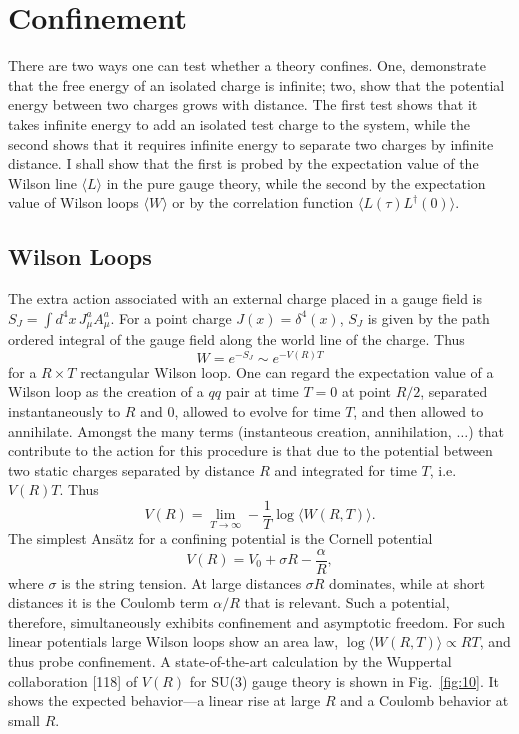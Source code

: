 \section{Confinement}
\label{sec:confinement}

There are two ways one can test whether a theory confines. One, demonstrate
that the free energy of an isolated charge is infinite; two, show that the
potential energy between two charges grows with distance. The first test
shows that it takes infinite energy to add an isolated test charge to the
system, while the second shows that it requires infinite energy to separate
two charges by infinite distance. I shall show that the first is probed by
the expectation value of the Wilson line $\langle L\rangle$ in the pure
gauge theory, while the second by the expectation value of Wilson loops
$\langle W\rangle$ or by the correlation function
$\langle L(\tau) L^\dagger(0)\rangle$.

\subsection{Wilson Loops}
\label{sec:wilson-loops}

The extra action associated with an external charge placed in a gauge field
is $S_J = \int d^4x\, J_\mu^a A_\mu^a$. For a point charge $J(x) =
\delta^4(x)$, $S_J$ is given by the path ordered integral of the gauge
field along the world line of the charge. Thus
\begin{equation}
  W = e^{-S_J} \sim e^{-V(R)T}
  \label{eq:wilson-exp}
\end{equation}
for a $R \times T$ rectangular Wilson loop. One can regard the expectation
value of a Wilson loop as the creation of a $qq$ pair at time $T = 0$ at
point $R/2$, separated instantaneously to $R$ and $0$, allowed to evolve
for time $T$, and then allowed to annihilate. Amongst the many terms
(instanteous creation, annihilation, $\ldots$) that contribute to the
action for this procedure is that due to the potential between two static
charges separated by distance $R$ and integrated for time $T$, i.e.\
$V(R)T$. Thus
\begin{equation}
  V(R) = \lim_{T\to\infty} -\frac{1}{T}\log\langle W(R,T)\rangle .
  \label{eq:V-from-W}
\end{equation}
The simplest Ans\"atz for a confining potential is the Cornell potential
\begin{equation}
  V(R) = V_0 + \sigma R - \frac{\alpha}{R},
  \label{eq:cornell}
\end{equation}
where $\sigma$ is the string tension. At large distances $\sigma R$
dominates, while at short distances it is the Coulomb term $\alpha/R$ that
is relevant. Such a potential, therefore, simultaneously exhibits
confinement and asymptotic freedom. For such linear potentials large Wilson
loops show an area law, $\log\langle W(R,T)\rangle \propto RT$, and thus
probe confinement. A state-of-the-art calculation by the Wuppertal
collaboration [118] of $V(R)$ for SU(3) gauge theory is shown in
Fig.~\ref{fig:10}. It shows the expected behavior---a linear rise at large
$R$ and a Coulomb behavior at small $R$.

